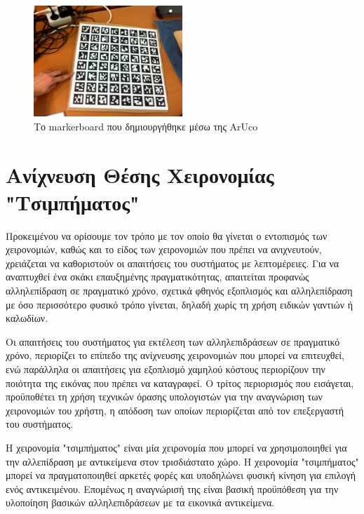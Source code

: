 \begin{figure}[H]
    \centering
    \includegraphics[width=0.5\textwidth]{Files/Figures/markerboard.jpg}
    \caption[Το markerboard που δημιουργήθηκε μέσω της ArUco]{Το markerboard που δημιουργήθηκε μέσω της ArUco}
    \label{fig:markerboard}
\end{figure}




\section{Ανίχνευση Θέσης Χειρονομίας "Τσιμπήματος"} \label{section:pinch}



Προκειμένου να ορίσουμε τον τρόπο με τον οποίο θα γίνεται ο εντοπισμός των χειρονομιών, καθώς και το είδος των χειρονομιών που πρέπει να ανιχνευτούν, χρειάζεται να καθοριστούν οι απαιτήσεις του συστήματος με λεπτομέρειες.
Για να αναπτυχθεί ένα σκάκι επαυξημένης πραγματικότητας, απαιτείται προφανώς αλληλεπίδραση σε πραγματικό χρόνο, σχετικά φθηνός εξοπλισμός και αλληλεπίδραση με όσο περισσότερο φυσικό τρόπο γίνεται, δηλαδή χωρίς τη χρήση ειδικών γαντιών ή καλωδίων. 

Οι απαιτήσεις του συστήματος για εκτέλεση των αλληλεπιδράσεων σε πραγματικό χρόνο, περιορίζει το επίπεδο της ανίχνευσης χειρονομιών που μπορεί να επιτευχθεί, ενώ παράλληλα οι απαιτήσεις για εξοπλισμό χαμηλού κόστους περιορίζουν την ποιότητα της εικόνας που πρέπει να καταγραφεί. Ο τρίτος περιορισμός που εισάγεται, προϋποθέτει τη χρήση τεχνικών όρασης υπολογιστών για την αναγνώριση των χειρονομιών του χρήστη, η απόδοση των οποίων περιορίζεται από τον επεξεργαστή του συστήματος. 



Η χειρονομία "τσιμπήματος" είναι μία χειρονομία που μπορεί να χρησιμοποιηθεί για την αλλεπίδραση με αντικείμενα στον τρισδιάστατο χώρο. Η χειρονομία "τσιμπήματος" μπορεί να πραγματοποιηθεί αρκετές φορές και υποδηλώνει φυσική κίνηση για επιλογή ενός αντικειμένου. Επομένως η αναγνώρισή της είναι βασική προϋπόθεση για την υλοποίηση βασικών αλληλεπιδράσεων με τα εικονικά αντικείμενα. 


